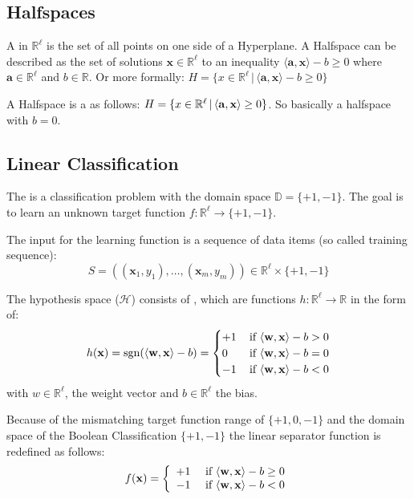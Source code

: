 \subsection{Halfspaces}
A  in $\mathbb{R}^{\ell}$ is the set of all points on one side of a Hyperplane. A Halfspace can be described as the set of solutions $\mathbf{x} \in \mathbb{R}^\ell$ to an inequality $\langle\mathbf{a}, \mathbf{x}\rangle - b \geq 0$ where $\mathbf{a} \in \mathbb{R}^\ell$ and $b \in \mathbb{R}$. Or more formally: $H = \{x \in \mathbb{R}^\ell \, | \, \langle\mathbf{a}, \mathbf{x}\rangle - b \geq 0\}$

A Halfspace is a  as follows: $H = \{x \in \mathbb{R}^\ell \, | \, \langle\mathbf{a}, \mathbf{x}\rangle \geq 0\}$. So basically a halfspace with $b = 0$.

\subsection{Linear Classification}
The  is a classification problem with the domain space $\mathbb{D} = \{+1,-1\}$. The goal is to learn an unknown target function $f:\mathbb{R}^\ell \rightarrow \{+1,-1\}$.

The input for the learning function is a sequence of data items (so called training sequence):
\begin{equation}
S=((\mathbf{x}_{1}, y_{1}), \ldots,(\mathbf{x}_{m}, y_{m})) \in \mathbb{R}^{\ell} \times\{+1,-1\}
\end{equation}

The hypothesis space ($\mathcal{H}$) consists of , which are functions $h:\mathbb{R}^\ell \rightarrow \mathbb{R}$ in the form of:
\begin{equation} 
h(\mathbf{x})=\operatorname{sgn}(\langle\mathbf{w}, \mathbf{x}\rangle- b)=
\begin{cases}
+1 & \, \text {if }\langle\mathbf{w}, \mathbf{x}\rangle - b>0 \\
0 & \,\text {if }\langle\mathbf{w}, \mathbf{x}\rangle - b=0 \\
-1 & \,\text {if }\langle\mathbf{w}, \mathbf{x}\rangle - b<0
\end{cases}
\end{equation}
with $w \in \mathbb{R}^\ell$, the weight vector and $b\in \mathbb{R}^\ell$ the bias.

Because of the mismatching target function range of $\{+1,0,-1\}$ and the domain space of the Boolean Classification $\{+1,-1\}$ the linear separator function is redefined as follows:
\begin{equation}
f(\mathbf{x})=\left\{\begin{array}{ll}{+1} & {\text { if } \langle\mathbf{w}, \mathbf{x}\rangle - b \geq 0} \\ {-1} & {\text { if }\langle\mathbf{w}, \mathbf{x}\rangle - b<0}\end{array}\right.
\end{equation}

